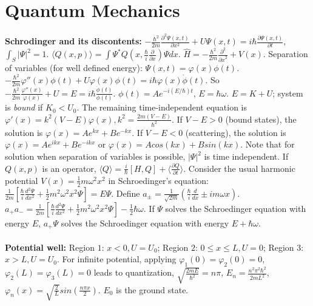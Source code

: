 \section{Quantum Mechanics}
{\bf Schrodinger and its discontents:}
$-{\frac {\hbar^2} {2m}} {\frac {\partial^2 \Psi (x, t)} {\partial x^2}} +
U \Psi(x,t)= i \hbar {\frac {\partial \Psi(x,t)} {\partial t}}$, $\int_S |\Psi|^2 =1$.  
$\langle Q(x,p)\rangle= 
\int \Psi^* Q(x,{\frac {\hbar} {i}}{\frac {\partial}{\partial x}}) \Psi dx$.
$\hat{H}= -{\frac {\hbar^2} {2m}} {\frac {\partial^2} {{\partial x}^2}} + V(x)$.
Separation of variables (for well defined
energy): $\Psi(x,t)= \varphi(x) \phi(t)$. 
$-{\frac {\hbar^2} {2m}} \varphi''(x) \phi(t) + 
U \varphi(x) \phi(t)= i \hbar \varphi(x) {\dot \phi}(t)$. 
So $-{\frac {\hbar^2} {2m}} {\frac {\varphi''(x)} {\varphi(x)}} + U = E=
i \hbar {\frac {{\dot \phi}(t)} {\phi(t)}}$. $\phi(t)= A e^{-i(E/\hbar)t}$,
$E= \hbar \omega$.  $E=K+U$; system is \emph{bound} if $K_0<U_0$.  The
remaining time-independent equation is
$\varphi'(x)= k^2 (V-E) \varphi(x), k^2= {\frac {2m(V-E)} {\hbar^2}}$.  
If $V-E>0$ (bound states), the solution is 
$\varphi(x)= A e^{kx}+ B e^{-kx}$.
If $V-E<0$ (scattering), the solution is 
$\varphi(x)= A e^{ikx}+ B e^{-ikx}$ or
$\varphi(x)= A cos(kx)+ B sin(kx)$.
Note that for solution when separation of variables is possible, $|\Psi|^2$ is time 
independent.  
If $Q(x,p)$ is an operator,
$\langle Q \rangle = {\frac {i} {\hbar}} [H, Q] + \langle {\frac {\partial Q} {\partial t}} \rangle$.
Consider the usual harmonic potential $V(x) = {\frac 1 2} m \omega^2 x^2$ in Schroedinger's equation:
${\frac {1} {2m}}[{\frac {\hbar} {i}} {\frac {d^2 \Psi}{dx^2}} + {\frac 1 2} m^2 \omega^2 x^2 \Psi]= E \Psi$.
Define $a_{\pm} = {\frac 1 {\sqrt {2m}}} ({\frac {\hbar} {i}} {\frac d {dx}} \pm i m \omega x)$.
$a_+ a_- = {\frac {1} {2m}}[{\frac {\hbar} {i}} {\frac {d^2 \Psi}{dx^2}} + {\frac 1 2} m^2 \omega^2 x^2 \Psi] - 
{\frac 1 2} \hbar \omega$.  If $\Psi$ solves the Schroedinger equation with energy $E$, $a_+ \Psi$  solves
the Schroedinger equation with energy $E + \hbar \omega$.
\\
\\
{\bf Potential well:}  
Region $1$: $x<0, U=U_0$; 
Region $2$: $0 \le x \le L, U=0$; 
Region $3$: $x > L, U=U_0$.  
For infinite potential, applying
$\varphi_1(0)= \varphi_2(0)=0$,
$\varphi_2(L)= \varphi_3(L)=0$ leads to quantization, 
${\sqrt {\frac {2mE}{\hbar^2}}} = n \pi$, $E_n= {\frac {n^2 \pi^2 \hbar^2} {2mL^2}}$,  
$\varphi_n(x)= {\sqrt {\frac 2 L}} sin({\frac {n \pi x} 2})$.  $E_0$ is the ground state.
